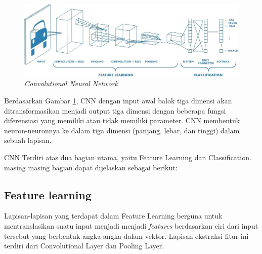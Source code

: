 \begin{figure}[ht]
  \centering

  \includegraphics[width=0.9\columnwidth]{gambar/cnn.jpeg}

  \caption{\emph{Convolutional Neural Network} \citep{cit:cnn}}
  \label{fig:cnn}
\end{figure}

Berdasarkan Gambar \ref{fig:cnn}, CNN dengan input awal balok tiga dimensi akan ditransformasikan menjadi output tiga dimensi dengan beberapa fungsi diferensiasi yang memiliki atau tidak memiliki parameter. CNN membentuk neuron-neuronnya ke dalam tiga dimensi (panjang, lebar, dan tinggi) dalam sebuah lapisan.

CNN Terdiri atas dua bagian utama, yaitu Feature Learning dan Classification. masing masing bagian dapat dijelaskan sebagai berikut:

\subsection{Feature learning}
\label{subsec:featurelearning}

Lapisan-lapisan yang terdapat dalam Feature Learning berguna untuk mentranslasikan suatu input menjadi menjadi \emph{features} berdasarkan ciri dari input tersebut yang berbentuk angka-angka dalam vektor. Lapisan ekstraksi ﬁtur ini terdiri dari Convolutional Layer dan Pooling Layer.


